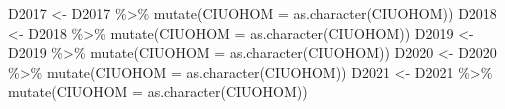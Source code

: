 \documentclass[
]{article}
\newenvironment{Shaded}{\begin{snugshade}}{\end{snugshade}}
\newcommand{\AttributeTok}[1]{\textcolor[rgb]{0.77,0.63,0.00}{#1}}
\newcommand{\FunctionTok}[1]{\textcolor[rgb]{0.00,0.00,0.00}{#1}}
\newcommand{\NormalTok}[1]{#1}
\newcommand{\OtherTok}[1]{\textcolor[rgb]{0.56,0.35,0.01}{#1}}
\newcommand{\SpecialCharTok}[1]{\textcolor[rgb]{0.00,0.00,0.00}{#1}}
\begin{document}
\begin{Shaded}
\begin{Highlighting}[]
\NormalTok{D2017 }\OtherTok{\textless{}{-}}\NormalTok{ D2017 }\SpecialCharTok{\%\textgreater{}\%} \FunctionTok{mutate}\NormalTok{(}\AttributeTok{CIUOHOM =} \FunctionTok{as.character}\NormalTok{(CIUOHOM))}
\NormalTok{D2018 }\OtherTok{\textless{}{-}}\NormalTok{ D2018 }\SpecialCharTok{\%\textgreater{}\%} \FunctionTok{mutate}\NormalTok{(}\AttributeTok{CIUOHOM =} \FunctionTok{as.character}\NormalTok{(CIUOHOM))}
\NormalTok{D2019 }\OtherTok{\textless{}{-}}\NormalTok{ D2019 }\SpecialCharTok{\%\textgreater{}\%} \FunctionTok{mutate}\NormalTok{(}\AttributeTok{CIUOHOM =} \FunctionTok{as.character}\NormalTok{(CIUOHOM))}
\NormalTok{D2020 }\OtherTok{\textless{}{-}}\NormalTok{ D2020 }\SpecialCharTok{\%\textgreater{}\%} \FunctionTok{mutate}\NormalTok{(}\AttributeTok{CIUOHOM =} \FunctionTok{as.character}\NormalTok{(CIUOHOM))}
\NormalTok{D2021 }\OtherTok{\textless{}{-}}\NormalTok{ D2021 }\SpecialCharTok{\%\textgreater{}\%} \FunctionTok{mutate}\NormalTok{(}\AttributeTok{CIUOHOM =} \FunctionTok{as.character}\NormalTok{(CIUOHOM))}
\end{Highlighting}
\end{Shaded}
\end{document}
